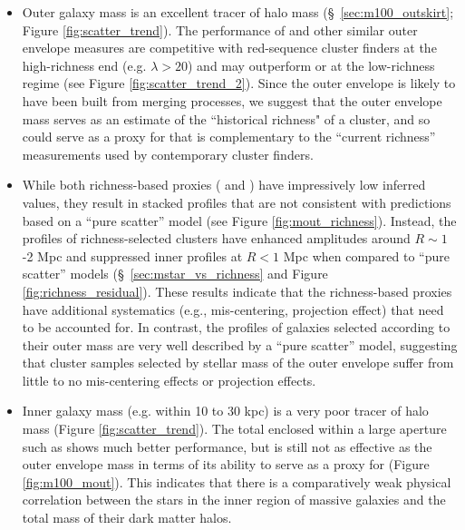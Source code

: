 \documentclass[fleqn,usenatbib,useAMS]{mnras}
\begin{document}
    \begin{itemize}
    
        \item Outer galaxy mass is an excellent tracer of halo mass (\S\ \ref{sec:m100_outskirt};
            Figure \ref{fig:scatter_trend}). 
            The performance of  and other similar outer envelope measures are 
            competitive with red-sequence cluster finders at the high-richness end (e.g. $\lambda >
            20$) and may outperform \redm{} or \camira{} at the low-richness regime 
            (see Figure \ref{fig:scatter_trend_2}).
            Since the outer envelope is likely to have been built from merging processes, we suggest
            that the outer envelope mass serves as an estimate of the ``historical richness" of a
            cluster, and so could serve as a proxy for \mvir{} that is complementary to the 
            ``current richness'' measurements used by contemporary cluster finders.
        
        \item While both richness-based \mvir{} proxies (\redm{} and \camira{}) have
            impressively low inferred \sigmvir{} values, they result in stacked \dsigma{} profiles
            that are not consistent with predictions based on a ``pure scatter'' model (see Figure
            \ref{fig:mout_richness}).
            Instead, the \dsigma{} profiles of richness-selected clusters have enhanced amplitudes
            around $R\sim 1$-2 Mpc and suppressed inner profiles at $R < 1$ Mpc when compared to
            ``pure scatter'' models (\S\ \ref{sec:mstar_vs_richness} and Figure
            \ref{fig:richness_residual}).
            These results indicate that the richness-based \mvir{} proxies have additional
            systematics (e.g., mis-centering, projection effect) that need to be accounted for. 
            In contrast, the \dsigma{} profiles of galaxies selected according to their outer mass
            are very well described by a ``pure scatter'' model, suggesting that cluster samples
            selected by stellar mass of the outer envelope suffer from little to no mis-centering
            effects or projection effects.
            
        \item Inner galaxy mass (e.g. \mstar{} within 10 to 30 kpc) is a very poor tracer of halo
            mass (Figure \ref{fig:scatter_trend}).
            The total \mstar{} enclosed within a large aperture such as  shows much
            better performance, but is still not as effective as the outer envelope mass in terms of
            its ability to serve as a proxy for \mvir{} (Figure \ref{fig:m100_mout}).
            This indicates that there is a comparatively weak physical correlation between the stars
            in the inner region of massive galaxies and the total mass of their dark matter halos. 
        

\end{itemize}
\end{document}
